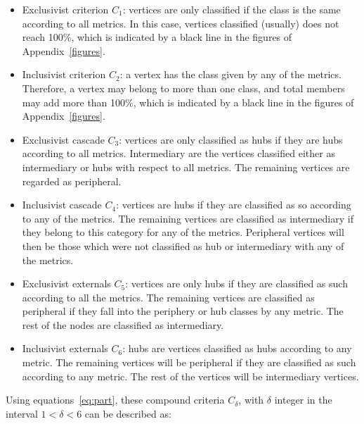 \documentclass[%
 aip,
 jmp,%
 amsmath,amssymb,
 reprint,%
]{revtex4-1}
\begin{document}
\begin{itemize}
    \item Exclusivist criterion $C_1$:  vertices are only classified if the class is the same according to all metrics. In this case, vertices classified (usually) does not reach 100\%, which is indicated by a black line in the figures of Appendix~\ref{figures}.
    \item Inclusivist criterion $C_2$: a vertex has the class given by any of the metrics. Therefore, a vertex may belong to more than one class, and total members may add more than 100\%, which is indicated by a black line in the figures of Appendix~\ref{figures}.
    \item Exclusivist cascade $C_3$: vertices are only classified as hubs if they are hubs according to all metrics. Intermediary are the vertices classified either as intermediary or hubs with respect to all metrics. The remaining vertices are regarded as peripheral.
    \item Inclusivist cascade $C_4$: vertices are hubs if they are classified as so according to any of the metrics. The remaining vertices are classified as intermediary if they belong to this category for any of the metrics. Peripheral vertices will then be those which were not classified as hub or intermediary with any of the metrics. 
    \item Exclusivist externals $C_5$: vertices are only hubs if they are classified as such according to all the metrics. The remaining vertices are classified as peripheral if they fall into the periphery or hub classes by any metric. The rest of the nodes are classified as intermediary.
    \item Inclusivist externals $C_6$: hubs are vertices classified as hubs according to any metric. The remaining vertices will be peripheral if they are classified as such according to any metric. The rest of the vertices will be intermediary vertices.
\end{itemize}

Using equations~\ref{eq:part}, these compound criteria $C_\delta$, with $\delta$ integer in the interval $1<\delta<6$ can be described as:
\end{document}

